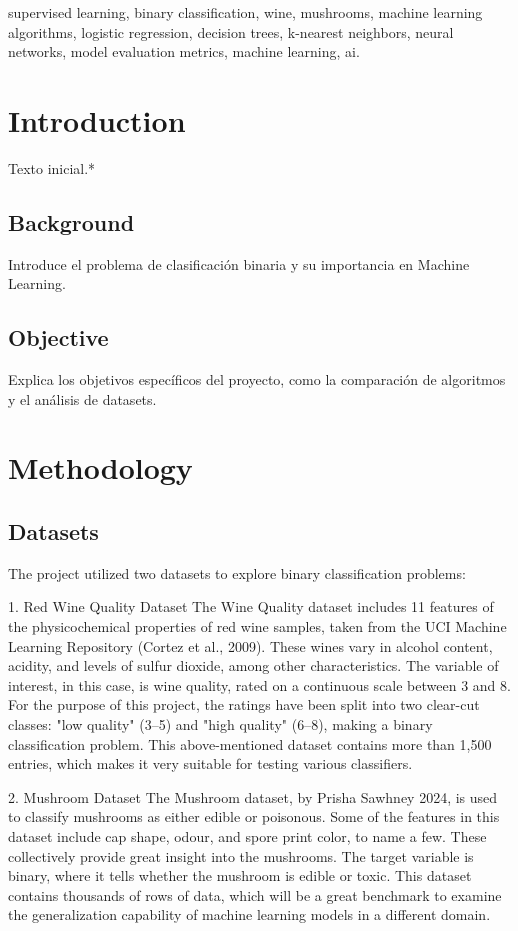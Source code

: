 \documentclass[conference]{IEEEtran}
\begin{document}
\begin{IEEEkeywords}
  supervised learning, binary classification, wine, mushrooms, machine learning algorithms, logistic regression, decision trees, k-nearest neighbors, neural networks, model evaluation metrics, machine learning, ai.
  \end{IEEEkeywords}

\section{Introduction}
Texto inicial.*

\subsection{Background}
Introduce el problema de clasificación binaria y su importancia en Machine Learning.

\subsection{Objective}
Explica los objetivos específicos del proyecto, como la comparación de algoritmos y el análisis de datasets.

\section{Methodology}

\subsection{Datasets}
The project utilized two datasets to explore binary classification problems:

1. Red Wine Quality Dataset
The Wine Quality dataset includes 11 features of the physicochemical properties of red wine samples, taken from the UCI Machine Learning Repository (Cortez et al., 2009). These wines vary in alcohol content, acidity, and levels of sulfur dioxide, among other characteristics. The variable of interest, in this case, is wine quality, rated on a continuous scale between 3 and 8. For the purpose of this project, the ratings have been split into two clear-cut classes: "low quality" (3–5) and "high quality" (6–8), making a binary classification problem. This above-mentioned dataset contains more than 1,500 entries, which makes it very suitable for testing various classifiers. 

2. Mushroom Dataset
The Mushroom dataset, by Prisha Sawhney 2024, is used to classify mushrooms as either edible or poisonous.
Some of the features in this dataset include cap shape, odour, and spore print color, to name a few. These collectively provide great insight into the mushrooms. The target variable is binary, where it tells whether the mushroom is edible or toxic. This dataset contains thousands of rows of data, which will be a great benchmark to examine the generalization capability of machine learning models in a different domain. 
\end{document}
